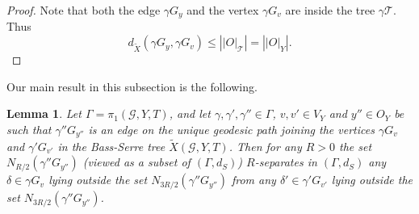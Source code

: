 \documentclass[12pt, a4paper]{article}
\newcommand{\8}{\infty}
\newcommand{\abs}[1]{\left| #1 \right|}
\theoremstyle{break}
\newtheorem{lm}[thm]{Lemma}
\theoremstyle{defbreak}
\newcommand{\wtl}[1]{\widetilde{#1}}
\begin{document}
\begin{proof}
    Note that both the edge $\gamma G_y$ and the vertex $\gamma G_v$ are inside the tree $\gamma \mathcal{T}$. Thus 
    $$d_{\wtl{X}}(\gamma G_y, \gamma G_v) \leqslant \abs{\abs{O}_\mathcal{T}} = \abs{\abs{O}_Y}.$$
\end{proof}

Our main result in this subsection is the following.

\medskip
\begin{lm}\label{separation-in-cayley-graph}
    Let $\Gamma=\pi_1(\mathcal{G}, Y, T)$, and let $\gamma,\gamma',\gamma''\in \Gamma$, $v,v'\in V_Y$ and $y''\in O_Y$ be such that $\gamma''G_{y''}$ is an edge on the unique geodesic path joining the vertices $\gamma G_v$ and $\gamma'G_{v'}$ in the Bass-Serre tree $\wtl{X}(\mathcal{G},Y,T)$. Then for any $R> 0$ the set $N_{R/2} (\gamma''G_{y''})$ (viewed as a subset of $(\Gamma,d_S)$) $R$-separates in $(\Gamma,d_S)$ any  $\delta\in\gamma G_v$ lying outside the set $N_{3R/2}(\gamma''G_{y''})$ from any $\delta'\in \gamma'G_{v'}$ lying outside the set $N_{3R/2}(\gamma''G_{y''})$.
\end{lm}
\end{document}
